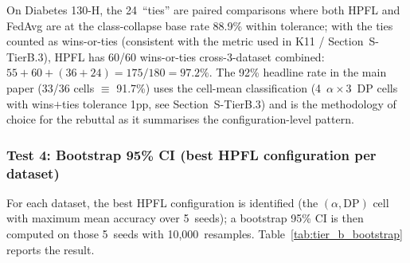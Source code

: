 \documentclass[conference]{IEEEtran}
\begin{document}
\begin{table}[htbp]
\centering
\caption{Wilcoxon signed-rank paired test (HPFL vs.\ FedAvg) on the 60~per-configuration pairs per dataset, plus per-dataset win/loss/tie breakdown ($\pm 1$pp tolerance).}
\label{tab:tier_b_wilcoxon}
\small
{}

\vspace{1mm}
\footnotesize{On Diabetes 130-H, the 24~``ties'' are paired comparisons where both HPFL and FedAvg are at the class-collapse base rate 88.9\% within tolerance; with the ties counted as wins-or-ties (consistent with the metric used in K11 / Section~S-TierB.3), HPFL has 60/60 wins-or-ties cross-3-dataset combined: $55{+}60{+}(36{+}24){=}175/180{=}97.2\%$. The 92\% headline rate in the main paper (33/36 cells $\equiv$ 91.7\%) uses the cell-mean classification (4~$\alpha\times 3$~DP cells with wins$+$ties tolerance 1pp, see Section~S-TierB.3) and is the methodology of choice for the rebuttal as it summarises the configuration-level pattern.}
\end{table}

\subsubsection*{Test 4: Bootstrap 95\% CI (best HPFL configuration per dataset)}

For each dataset, the best HPFL configuration is identified (the $(\alpha,\text{DP})$ cell with maximum mean accuracy over 5~seeds); a bootstrap 95\% CI is then computed on those 5~seeds with 10{,}000~resamples. Table~\ref{tab:tier_b_bootstrap} reports the result.
\end{document}

